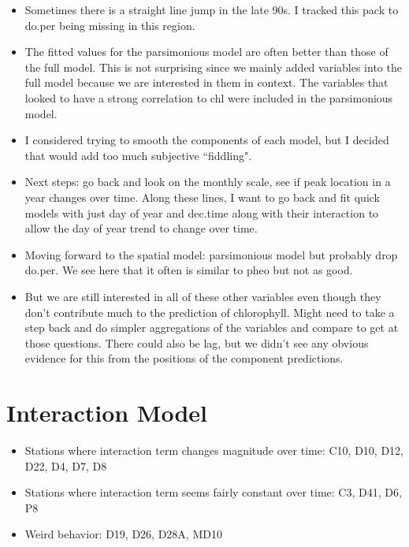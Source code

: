 \documentclass[12pt]{amsart}
\begin{document}
\begin{itemize}
\item Sometimes there is a straight line jump in the late 90s. I tracked this pack to do.per being missing in this region.
\item The fitted values for the parsimonious model are often better than those of the full model. This is not surprising since we mainly added variables into the full model because we are interested in them in context. The variables that looked to have a strong correlation to chl were included in the parsimonious model.
\item I considered trying to smooth the components of each model, but I decided that would add too much subjective ``fiddling".
\item Next steps: go back and look on the monthly scale, see if peak location in a year changes over time. Along these lines, I want to go back and fit quick models with just day of year and dec.time along with their interaction to allow the day of year trend to change over time. 
\item Moving forward to the spatial model: parsimonious model but probably drop do.per. We see here that it often is similar to pheo but not as good.
\item But we are still interested in all of these other variables even though they don't contribute much to the prediction of chlorophyll. Might need to take a step back and do simpler aggregations of the variables and compare to get at those questions. There could also be lag, but we didn't see any obvious evidence for this from the positions of the component predictions.
\end{itemize}

\section{Interaction Model}

\begin{itemize}
\item Stations where interaction term changes magnitude over time: C10, D10, D12, D22, D4, D7, D8
\item Stations where interaction term seems fairly constant over time: C3, D41, D6, P8
\item Weird behavior: D19, D26, D28A, MD10
\end{itemize}
\end{document}
